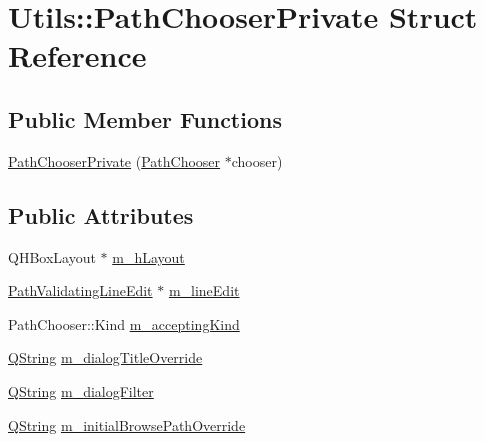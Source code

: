 \hypertarget{struct_utils_1_1_path_chooser_private}{\section{Utils\-:\-:Path\-Chooser\-Private Struct Reference}
\label{struct_utils_1_1_path_chooser_private}
}
\subsection*{Public Member Functions}
\begin{DoxyCompactItemize}
\item 
\hyperlink{struct_utils_1_1_path_chooser_private_a1f39942cdf20577592d0bfdf6b85414c}{Path\-Chooser\-Private} (\hyperlink{class_utils_1_1_path_chooser}{Path\-Chooser} $\ast$chooser)
\end{DoxyCompactItemize}
\subsection*{Public Attributes}
\begin{DoxyCompactItemize}
\item 
Q\-H\-Box\-Layout $\ast$ \hyperlink{struct_utils_1_1_path_chooser_private_a774f99b0dc2901501561d86a347c1966}{m\-\_\-h\-Layout}
\item 
\hyperlink{class_utils_1_1_path_validating_line_edit}{Path\-Validating\-Line\-Edit} $\ast$ \hyperlink{struct_utils_1_1_path_chooser_private_ae5140b32894490e7013b4f9f8ee18afc}{m\-\_\-line\-Edit}
\item 
Path\-Chooser\-::\-Kind \hyperlink{struct_utils_1_1_path_chooser_private_a11637562bcf59fc369d6e65b4f01cb77}{m\-\_\-accepting\-Kind}
\item 
\hyperlink{group___u_a_v_objects_plugin_gab9d252f49c333c94a72f97ce3105a32d}{Q\-String} \hyperlink{struct_utils_1_1_path_chooser_private_a5a95de28d99841640ca55678d9795a62}{m\-\_\-dialog\-Title\-Override}
\item 
\hyperlink{group___u_a_v_objects_plugin_gab9d252f49c333c94a72f97ce3105a32d}{Q\-String} \hyperlink{struct_utils_1_1_path_chooser_private_aa4d089b9547a21ea1d39c8c8151b82d9}{m\-\_\-dialog\-Filter}
\item 
\hyperlink{group___u_a_v_objects_plugin_gab9d252f49c333c94a72f97ce3105a32d}{Q\-String} \hyperlink{struct_utils_1_1_path_chooser_private_a4f55a8d0bc8cc0199a158f632e6f053a}{m\-\_\-initial\-Browse\-Path\-Override}
\end{DoxyCompactItemize}


